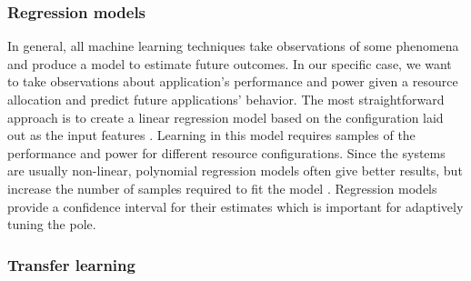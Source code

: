 
\subsubsection{Regression models}
  In general, all
machine learning techniques take observations of some phenomena and
produce a model to estimate future outcomes.  In our specific case, we
want to take observations about application's performance and power
given a resource allocation and predict future applications' behavior.
The most straightforward approach is to create a linear regression
model based on the configuration laid out as the input features
\cite{}. Learning in this model requires samples of the performance
and power for different resource configurations. Since the systems are
usually non-linear, polynomial regression models often give better
results, but increase the number of samples required to fit the model
\cite{}. Regression models provide a confidence interval for their
estimates which is important for adaptively tuning the pole.

\subsubsection{Transfer learning}

